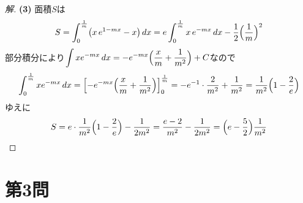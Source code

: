 \documentclass[../main.tex]{subfiles}
\begin{document}
\begin{proof}[解]
  \textbf{(3)} 面積$S$は
  \begin{align*}
    S=\int_0^{\frac1m}\bigl(x\,e^{1-mx}-x\bigr)\,dx=e\int_0^{\frac1m}x\,e^{-mx}\,dx-\frac12\Bigl(\frac1m\Bigr)^2
  \end{align*}
  部分積分により$\displaystyle\int xe^{-mx}\,dx=-e^{-mx}\Bigl(\frac xm+\frac1{m^2}\Bigr)+C$なので
  \begin{align*}
    \int_0^{\frac1m}xe^{-mx}\,dx=\Bigl[-e^{-mx}\Bigl(\frac xm+\frac1{m^2}\Bigr)\Bigr]_0^{\frac1m}=-e^{-1}\cdot\frac2{m^2}+\frac1{m^2}=\frac1{m^2}\Bigl(1-\frac2e\Bigr)
  \end{align*}
  ゆえに
  \begin{align*}
    S=e\cdot\frac1{m^2}\Bigl(1-\frac2e\Bigr)-\frac1{2m^2}=\frac{e-2}{m^2}-\frac1{2m^2}=\Bigl(e-\frac52\Bigr)\frac1{m^2}
  \end{align*}
\end{proof}

\newpage

\section*{第3問}
\end{document}
